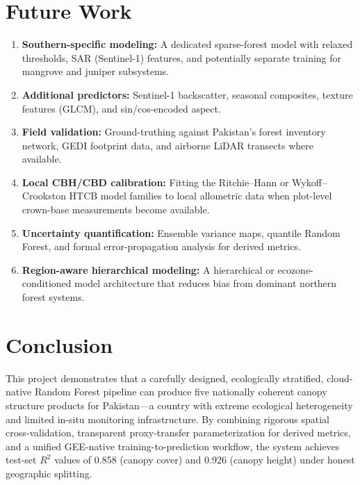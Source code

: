 \documentclass[12pt,a4paper,twoside]{article}
\begin{document}
\section{Future Work}\label{sec:future}

\begin{enumerate}
  \item \textbf{Southern-specific modeling:} A dedicated sparse-forest model with
    relaxed thresholds, SAR (Sentinel-1) features, and potentially separate training
    for mangrove and juniper subsystems.

  \item \textbf{Additional predictors:} Sentinel-1 backscatter, seasonal composites,
    texture features (GLCM), and sin/cos-encoded aspect.

  \item \textbf{Field validation:} Ground-truthing against Pakistan's forest
    inventory network, GEDI footprint data, and airborne LiDAR transects where
    available.

  \item \textbf{Local CBH/CBD calibration:} Fitting the Ritchie--Hann or
    Wykoff--Crookston HTCB model families to local allometric data when plot-level
    crown-base measurements become available.

  \item \textbf{Uncertainty quantification:} Ensemble variance maps, quantile
    Random Forest, and formal error-propagation analysis for derived metrics.

  \item \textbf{Region-aware hierarchical modeling:} A hierarchical or
    ecozone-conditioned model architecture that reduces bias from dominant northern
    forest systems.
\end{enumerate}

\section{Conclusion}\label{sec:conclusion}

This project demonstrates that a carefully designed, ecologically stratified,
cloud-native Random Forest pipeline can produce five nationally coherent canopy
structure products for Pakistan---a country with extreme ecological heterogeneity
and limited in-situ monitoring infrastructure.  By combining rigorous spatial
cross-validation, transparent proxy-transfer parameterization for derived metrics,
and a unified GEE-native training-to-prediction workflow, the system achieves
test-set $R^{2}$ values of 0.858 (canopy cover) and 0.926 (canopy height) under
honest geographic splitting.
\end{document}
